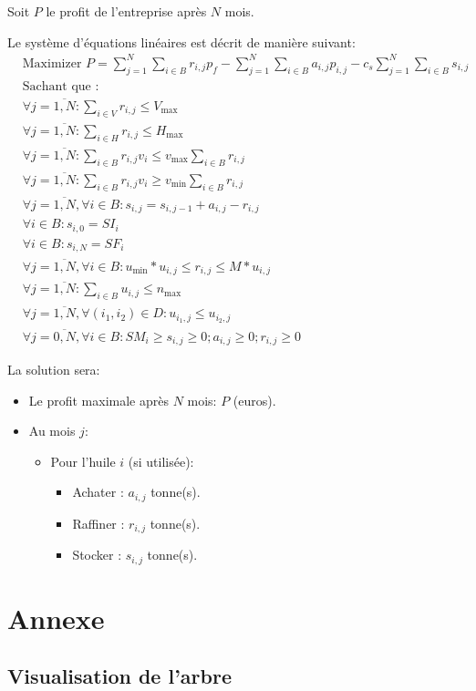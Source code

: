 \documentclass[10pt,a4paper]{article}
\begin{document}
Soit $P$ le profit de l'entreprise après $N$ mois.

Le système d'équations linéaires est décrit de manière suivant:
\begin{align*}
    & \text{Maximizer } P = \sum\limits_{j = 1}^N {\sum\limits_{i \in B}^{} {{r_{i,j}}p_f} }  - \sum\limits_{j = 1}^N {\sum\limits_{i \in B}^{} {{a_{i,j}}{p_{i,j}}} }  - {c_s}\sum\limits_{j = 1}^N {\sum\limits_{i \in B}^{} {{s_{i,j}}} }\\
    & \text{Sachant que : }\\
    & \forall j = \overline {1,N} :\sum\limits_{i \in V}^{} {{r_{i,j}}}  \le {V_{\max }}\\
    & \forall j = \overline {1,N} :\sum\limits_{i \in H}^{} {{r_{i,j}}}  \le {H_{\max }}\\
    & \forall j = \overline {1,N} :\sum\limits_{i \in B}^{} {{r_{i,j}}{v_i}}  \le {v_{\max }}\sum\limits_{i \in B}^{} {{r_{i,j}}} \\
    & \forall j = \overline {1,N} :\sum\limits_{i \in B}^{} {{r_{i,j}}{v_i}}  \ge {v_{\min }}\sum\limits_{i \in B}^{} {{r_{i,j}}} \\
    & \forall j = \overline {1,N} ,\forall i \in B:{s_{i,j}} = {s_{i,j - 1}} + {a_{i,j}} - {r_{i,j}}\\
    & \forall i \in B:{s_{i,0}} = {SI_i}\\
    & \forall i \in B:{s_{i,N}} = {SF_i}\\
    & \forall j = \overline {1,N} ,\forall i \in B:{u_{\min }}*{u_{i,j}} \le {r_{i,j}} \le M*{u_{i,j}}\\
    & \forall j = \overline {1,N} :\sum\limits_{i \in B}^{} {{u_{i,j}}}  \le {n_{\max }}\\
    & \forall j = \overline {1,N} ,\forall \left( {{i_1},{i_2}} \right) \in D:{u_{{i_1},j}} \le {u_{{i_2},j}}\\
    & \forall j = \overline {0,N} ,\forall i \in B:S{M_i} \ge {s_{i,j}} \ge 0;{a_{i,j}} \ge 0;{r_{i,j}} \ge 0
\end{align*}

La solution sera:
\begin{itemize}
    \item Le profit maximale après $N$ mois: $P$ (euros).
    \item Au mois $j$:
    \begin{itemize}
        \item Pour l'huile $i$ (si utilisée):
        \begin{itemize}
            \item Achater : $a_{i,j}$ tonne(s).
            \item Raffiner : $r_{i,j}$ tonne(s).
            \item Stocker : $s_{i,j}$ tonne(s).
        \end{itemize}
    \end{itemize}
\end{itemize}

\section{Annexe}

\subsection{Visualisation de l'arbre}


\end{document}
